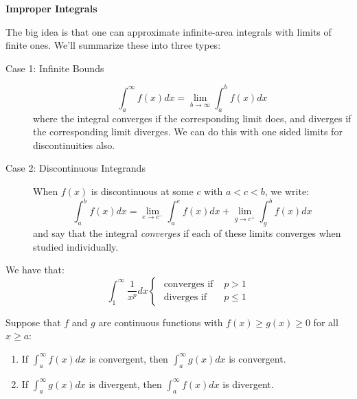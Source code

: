 
\chead{\today}
\graphicspath{ {\string~/Desktop} }
\usetikzlibrary{arrows}
\newcommand{\ans}[1]{ \noindent {\color{red} \textbf{Answer:} #1}}
\renewcommand{\ans}[1]{\vspace{3in}}

\begin{center}
\textbf{Improper Integrals}
\end{center}

\begin{aun}
The big idea is that one can approximate infinite-area integrals with limits of finite ones. We'll summarize these into three types:
\begin{description}
\item[Case 1: Infinite Bounds] \[
\int_a^\infty f(x) dx = \lim_{b \to \infty} \int_a^b f(x)dx
\]
where the integral converges if the corresponding limit does, and diverges if the corresponding limit diverges. We can do this with one sided limits for discontinuities also. 
\item[Case 2: Discontinuous Integrands] When $f(x)$ is discontinuous at some $c$ with $a < c < b$, we write:
\[
\int_a^b f(x)dx = \lim_{e \to c^-} \int_a^e f(x) dx + \lim_{g \to c^+} \int_g^b f(x) dx
\]
and say that the integral \emph{converges} if each of these limits converges when studied individually. 
\end{description}
\end{aun}
\begin{prop}
We have that:
\[
\int_{1}^\infty \frac{1}{x^p} dx \begin{cases}
\text{ converges if } & p > 1\\
\text{ diverges if } & p \leq 1
\end{cases}
\]
\end{prop}
\begin{thm}
Suppose that $f$ and $g$ are continuous functions with $f(x) \geq g(x) \geq 0$ for all $x \geq a$:
\begin{enumerate}[label=\alph*.]
\item If $\int_a^\infty f(x) dx$ is convergent, then $\int_a^\infty g(x) dx$ is convergent.
\item If $\int_a^\infty g(x) dx$ is divergent, then $\int_a^\infty f(x) dx$ is divergent.
\end{enumerate}
\end{thm}


